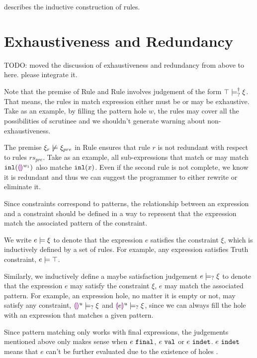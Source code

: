 \documentclass[acmsmall,screen,review,nonacm]{acmart}
\theoremstyle{slplain}
\numberwithin{thm}{section}
\begin{document}


 describes the inductive construction of rules. 




\section{Exhaustiveness and Redundancy}
\label{sec:exhaustiveness-redundancy}
TODO: moved the discussion of exhaustiveness and redundancy from above to here. please integrate it.

Note that the premise of Rule \TMatchZPre and Rule \TMatchNZPre involves judgement of the form $\top \models_{?}^{\dag} \xi$. That means, the rules in match expression either must be or may be exhaustive.
Take  as an example, by filling the pattern hole $w$, the rules may cover all the possibilities of scrutinee and we shouldn't generate warning about non-exhaustiveness.

The premise $\xi_r \not\models \xi_{pre}$ in Rule \TRules ensures that rule $r$ is not redundant with respect to rules $rs_{pre}$.
Take  as an example, all sub-expressions that match or may match $\mathtt{inl}(\textcolor{violet}{\llparenthesis}\textcolor{violet}{\rrparenthesis}^{w_1})$ also matche $\mathtt{inl}(x)$.
Even if the second rule is not complete, we know it is redundant and thus we can suggest the programmer to either rewrite or eliminate it.

Since constraints correspond to patterns, the relationship between an expression and a constraint should be defined in a way to represent that the expression match the associated pattern of the constraint.

We write $e \models \xi$ to denote that the expression $e$ satisfies the constraint $\xi$, which is inductively defined by a set of rules. For example, any expression satisfies Truth constraint, $e \models \top$.

Similarly, we inductively define a maybe satisfaction judgement $e \models_{?} \xi$ to denote that the expression $e$ may satisfy the constraint $\xi$, \ie $e$ may match the associated pattern. For example, an expression hole, no matter it is empty or not, may satisfy any constraint, \ie $\textcolor{violet}{\llparenthesis}\textcolor{violet}{\rrparenthesis}^{u} \models_{?} \xi$ and $\textcolor{violet}{\llparenthesis} e\textcolor{violet}{\rrparenthesis}^{u} \models_{?} \xi$, since we can always fill the hole with an expression that matches a given pattern.

Since pattern matching only works with final expressions, the judgements mentioned above only makes sense when $e ~\mathtt{final}$, \ie $e ~\mathtt{val}$ or $e ~\mathtt{indet}$. $e ~\mathtt{indet}$ means that $e$ can't be further evaluated due to the existence of holes \cite{DBLP:journals/pacmpl/OmarVCH19}.
\end{document}
